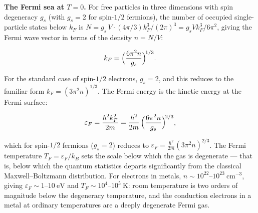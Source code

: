 \medskip\noindent\textbf{The Fermi sea at $T = 0$.}
For free particles in three dimensions with spin degeneracy $g_s$ (with $g_s = 2$ for spin-$1/2$ fermions), the number of occupied single-particle states below $k_F$ is $N = g_s\,V\cdot(4\pi/3)k_F^3/(2\pi)^3 = g_s V k_F^3/6\pi^2$, giving the Fermi wave vector in terms of the density $n = N/V$:
\begin{linenomath}
    \begin{equation}
        k_F = \Bigl(\frac{6\pi^2 n}{g_s}\Bigr)^{\!1/3}.
    \end{equation}
\end{linenomath}
For the standard case of spin-$1/2$ electrons, $g_s = 2$, and this reduces to the familiar form $k_F = (3\pi^2 n)^{1/3}$.
The Fermi energy is the kinetic energy at the Fermi surface:
\begin{linenomath}
    \begin{equation}
        \varepsilon_F = \frac{\hbar^2 k_F^2}{2m}
                      = \frac{\hbar^2}{2m}\,
                        \Bigl(\frac{6\pi^2 n}{g_s}\Bigr)^{\!2/3},
        \label{eq:fermi-energy}
    \end{equation}
\end{linenomath}
which for spin-$1/2$ fermions ($g_s = 2$) reduces to $\varepsilon_F = \frac{\hbar^2}{2m}(3\pi^2 n)^{2/3}$.
The Fermi temperature $T_F = \varepsilon_F/k_B$ sets the scale below which the gas is degenerate --- that is, below which the quantum statistics departs significantly from the classical Maxwell--Boltzmann distribution. For electrons in metals, $n \sim 10^{22}$--$10^{23}\ \text{cm}^{-3}$, giving $\varepsilon_F \sim 1$--$10\ \text{eV}$ and $T_F \sim 10^4$--$10^5\ \text{K}$: room temperature is two orders of magnitude below the degeneracy temperature, and the conduction electrons in a metal at ordinary temperatures are a deeply degenerate Fermi gas.

